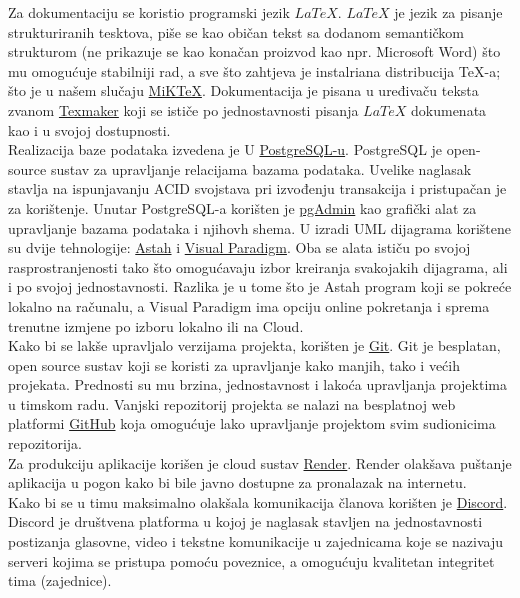 			Za dokumentaciju se koristio programski jezik \href{https://www.latex-project.org//}{$LaTeX$}. $LaTeX$ je jezik za pisanje strukturiranih tesktova, piše se kao običan tekst sa dodanom semantičkom strukturom (ne prikazuje se kao konačan proizvod kao npr. Microsoft Word) što mu omogućuje stabilniji rad, a sve što zahtjeva je instalriana distribucija TeX-a; što je u našem slučaju \href{https://miktex.org/}{MiKTeX}. Dokumentacija je pisana u uređivaču teksta zvanom \href{https://www.xm1math.net/texmaker/}{Texmaker} koji se ističe po jednostavnosti pisanja $LaTeX$ dokumenata kao i u svojoj dostupnosti.\\
			Realizacija baze podataka izvedena je U \href{https://www.postgresql.org/}{PostgreSQL-u}. PostgreSQL je open-source sustav za upravljanje relacijama bazama podataka. Uvelike naglasak stavlja na ispunjavanju ACID svojstava pri izvođenju transakcija i pristupačan je za korištenje. Unutar PostgreSQL-a korišten je \href{https://www.pgadmin.org/}{pgAdmin} kao grafički alat za upravljanje bazama podataka i njihovh shema.
			U izradi UML dijagrama korištene su dvije tehnologije: \href{https://astah.net/}{Astah} i \href{https://www.visual-paradigm.com/}{Visual Paradigm}. Oba se alata ističu po svojoj rasprostranjenosti tako što omogućavaju izbor kreiranja svakojakih dijagrama, ali i po svojoj jednostavnosti. Razlika je u tome što je Astah program koji se pokreće lokalno na računalu, a Visual Paradigm ima opciju online pokretanja i sprema trenutne izmjene po izboru lokalno ili na Cloud.\\
			Kako bi se lakše upravljalo verzijama projekta, korišten je \href{https://git-scm.com/}{Git}. Git je besplatan, open source sustav koji se koristi za upravljanje kako manjih, tako i većih projekata. Prednosti su mu brzina, jednostavnost i lakoća upravljanja projektima u timskom radu. Vanjski repozitorij projekta se nalazi na besplatnoj web platformi \href{https://github.com/}{GitHub} koja omogućuje lako upravljanje projektom svim sudionicima repozitorija. \\
			Za produkciju aplikacije korišen je cloud sustav \href{https://render.com/}{Render}. Render olakšava puštanje aplikacija u pogon kako bi bile javno dostupne za pronalazak na internetu. \\
			Kako bi se u timu maksimalno olakšala komunikacija članova korišten je \href{https://discord.com/}{Discord}. Discord je društvena platforma u kojoj je naglasak stavljen na jednostavnosti postizanja glasovne, video i tekstne komunikacije u zajednicama koje se nazivaju serveri kojima se pristupa pomoću poveznice, a omogućuju kvalitetan integritet tima (zajednice).
			\eject 
		
